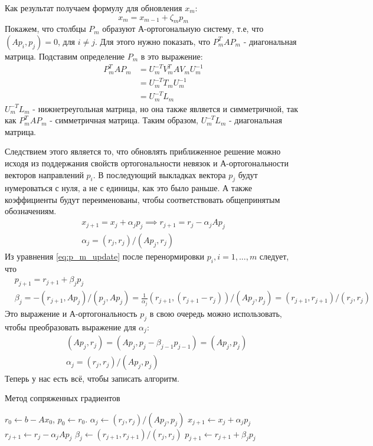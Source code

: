 Как результат получаем формулу для обновления $x_m$:
\begin{equation*}
    x_m = x_{m-1} + \zeta_m p_m
\end{equation*}
Покажем, что столбцы $P_m$ образуют А-ортогональную систему, т.е, что $(Ap_i,p_j) = 0$, для $i \neq j$.
Для этого нужно показать, что $P_m^T AP_m$ - диагональная матрица. Подставим определение $P_m$ в это выражение:
\begin{align}
    P_m^T AP_m &= U_m^{-T}V_m^T AV_m U_m^{-1} \\
               &= U_m^{-T}T_m U_m^{-1} \\
               &=U_m^{-T}L_m
\end{align}
$U_m^{-T}L_m$ - нижнетреугольная матрица, но она также является и симметричной, 
так как $P_m^T AP_m$ - симметричная матрица. Таким образом, $U_m^{-T}L_m$ - диагональная матрица.
\par Следствием этого является то, что обновлять приближенное решение можно исходя из
поддержания свойств ортогональности невязок и А-ортогональности векторов направлений $p_i$.
В последующий выкладках вектора $p_j$ будут нумероваться с нуля, а не с единицы, как это было раньше.
А также коэффициенты будут переименованы, чтобы соответствовать общепринятым обозначениям.
\begin{align*}
    x_{j+1} = x_j + \alpha_j p_j \implies r_{j+1} = r_j - \alpha_j A p_j \\
    \alpha_j = \left( r_j, r_j \right) / \left( Ap_j, r_j \right)
\end{align*}
Из уравнения \eqref{eq:p_m_update} после перенормировки $p_i, i=1,...,m$ следует, что 
\begin{align*}
    &p_{j+1} = r_{j+1} + \beta_j p_j  \\
    &\beta_j = - (r_{j+1}, Ap_j) / (p_j, Ap_j) = \frac{1}{\alpha_j} (r_{j+1}, (r_{j+1}-r_j)) / (Ap_j,p_j) = (r_{j+1}, r_{j+1}) / (r_j,r_j)
\end{align*}
Это выражение и А-ортогональность $p_j$ в свою очередь можно использовать, чтобы преобразовать выражение для $\alpha_j$:
\begin{align*}
    &(Ap_j,r_j) = (Ap_j,p_j-\beta_{j-1}p_{j-1}) = (Ap_j,p_j) \\
    &\alpha_j = (r_j,r_j)/(Ap_j, p_j)
\end{align*}
Теперь у нас есть всё, чтобы записать алгоритм.
\begin{algorithm}
    \caption{Метод сопряженных градиентов}
    \begin{algorithmic}[1]
    \State $r_0 \gets b - A x_0$, $p_0 \gets r_0$.
        \State $\alpha_j \gets (r_j, r_j) / (A p_j, p_j)$
        \State $x_{j+1} \gets x_j + \alpha_j p_j$
        \State $r_{j+1} \gets r_j - \alpha_j A p_j$
        \State $\beta_j \gets (r_{j+1}, r_{j+1}) / (r_j, r_j)$
        \State $p_{j+1} \gets r_{j+1} + \beta_j p_j$
    \EndFor
    \end{algorithmic}
\end{algorithm}

